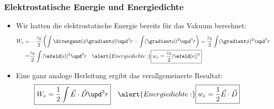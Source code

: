 \begin{frame}
\frametitle{Elektrostatische Energie und Energiedichte}
\begin{itemize}[<+->]
\item Wir hatten die elektrostatische Energie bereits für das \alert{Vakuum} berechnet:
       \begin{align*}
      W_e = & -\frac{\varepsilon_0}{2}\left(\int \divergenz(\phi\gradient\phi)
      \upd^3 r - \int (\gradient\phi)^2 \upd^3 r\right)  =
                     \frac{\varepsilon_0}{2} \int (\gradient\phi)^2 \upd^3 r\\
        = & \frac{\varepsilon_0}{2} \int |\efeld[v]|^2 \upd^3 r
            \quad\alert{Energiedichte:} \boxed{w_e = \frac{\varepsilon_0}{2} |\efeld[v]|^2}
      \end{align*}
 \item Eine ganz analoge Herleitung ergibt das \alert{verallgemeinerte Resultat}:
     $$
      \boxed{W_e = \frac{1}{2}\int \vec{E}\cdot\vec{D} \upd^3 r}
            \quad\alert{Energiedichte:} \boxed{w_e = \frac{1}{2} \vec{E}\cdot\vec{D}}
      $$
 \end{itemize}
\end{frame}
  

   

